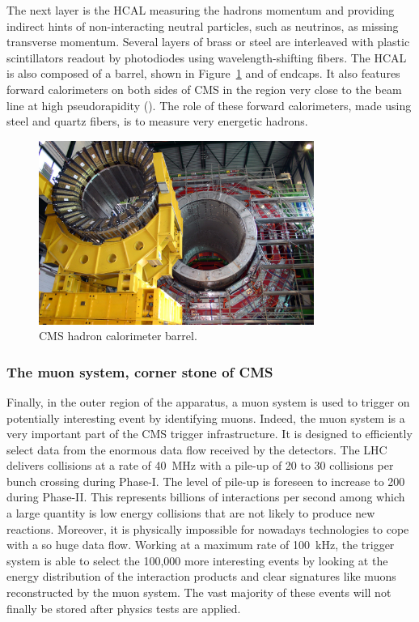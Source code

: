 	The next layer is the HCAL measuring the hadrons momentum and providing indirect hints of non-interacting neutral particles, such as neutrinos, as missing transverse momentum. Several layers of brass or steel are interleaved with plastic scintillators readout by photodiodes using wavelength-shifting fibers. The HCAL is also composed of a barrel, shown in Figure~\ref{fig:HCAL} and of endcaps. It also features forward calorimeters on both sides of CMS in the region very close to the beam line at high pseudorapidity (). The role of these forward calorimeters, made using steel and quartz fibers, is to measure very energetic hadrons.
	
	\begin{figure}[H]
		\centering
		\includegraphics[height = 6cm]{fig/chapt2/HCAL.jpg}
		\caption{\label{fig:HCAL} CMS hadron calorimeter barrel.}
	\end{figure}
	
		\subsubsection{The muon system, corner stone of CMS}
		\label{chapt2:sssec:muon}
	
	Finally, in the outer region of the apparatus, a muon system is used to trigger on potentially interesting event by identifying muons. Indeed, the muon system is a very important part of the CMS trigger infrastructure. It is designed to efficiently select data from the enormous data flow received by the detectors. The LHC delivers collisions at a rate of \SI{40}{MHz} with a pile-up of 20 to 30 collisions per bunch crossing during Phase-I. The level of pile-up is foreseen to increase to 200 during Phase-II. This represents billions of interactions per second among which a large quantity is low energy collisions that are not likely to produce new reactions. Moreover, it is physically impossible for nowadays technologies to cope with a so huge data flow. Working at a maximum rate of \SI{100}{kHz}, the trigger system is able to select the 100,000 more interesting events by looking at the energy distribution of the interaction products and clear signatures like muons reconstructed by the muon system. The vast majority of these events will not finally be stored after physics tests are applied.
	
